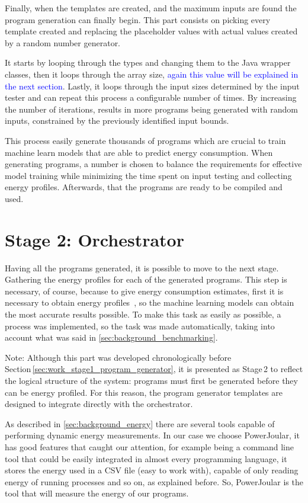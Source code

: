Finally, when the templates are created, and the maximum inputs are found the program generation can finally begin. This part consists on picking every template created and replacing the placeholder values with actual values created by a random number generator.

It starts by looping through the types and changing them to the Java wrapper classes, then it loops through the array size, \textcolor{blue}{{again this value will be explained in the next section}}. Lastly, it loops through the input sizes determined by the input tester and can repeat this process a configurable number of times. By increasing the number of iterations, results in more programs being generated with random inputs, constrained by the previously identified input bounds.

This process easily generate thousands of programs which are crucial to train machine learn models that are able to predict energy consumption. When generating programs, a number is chosen to balance the requirements for effective model training while minimizing the time spent on input testing and collecting energy profiles. Afterwards, that the programs are ready to be compiled and used.



\section{Stage 2: Orchestrator} \label{sec:work_stage2_orchestrator}

Having all the programs generated, it is possible to move to the next stage. Gathering the energy profiles for each of the generated programs. This step is necessary, of course, because to give energy consumption estimates, first it is necessary to obtain energy profiles~\cite{10.1145/2884781.2884869,8816747}, so the machine learning models can obtain the most accurate results possible. To make this task as easily as possible, a process was implemented, so the task was made automatically, taking into account what was said in \ref{sec:background_benchmarking}. 

Note: Although this part was developed chronologically before Section \ref{sec:work_stage1_program_generator}, it is presented as Stage 2 to reflect the logical structure of the system: programs must first be generated before they can be energy profiled. For this reason, the program generator templates are designed to integrate directly with the orchestrator.

As described in \ref{sec:background_energy} there are several tools capable of performing dynamic energy measurements. In our case we choose PowerJoular, it has good features that caught our attention, for example being a command line tool that could be easily integrated in almost every programming language, it stores the energy used in a CSV file (easy to work with), capable of only reading energy of running processes and so on, as explained before. So, PowerJoular is the tool that will measure the energy of our programs.

